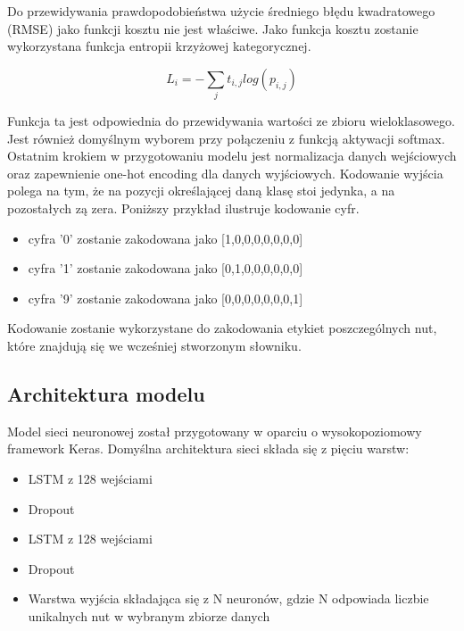 	
	
	Do przewidywania prawdopodobieństwa użycie średniego błędu kwadratowego (RMSE) jako funkcji kosztu nie jest właściwe. Jako funkcja kosztu zostanie wykorzystana funkcja entropii krzyżowej kategorycznej. 
	
	\begin{equation}
	L_{i} = - \sum_{j}t_{i,j} log(p_{i,j})
	\end{equation}
	
	Funkcja ta jest odpowiednia do przewidywania wartości ze zbioru wieloklasowego. Jest również domyślnym wyborem przy połączeniu z funkcją aktywacji softmax. Ostatnim krokiem w przygotowaniu modelu jest normalizacja danych wejściowych oraz zapewnienie one-hot encoding dla danych wyjściowych. Kodowanie wyjścia polega na tym, że na pozycji określającej daną klasę stoi jedynka, a na pozostałych zą zera. Poniższy przykład ilustruje kodowanie cyfr. 
	
	\begin{itemize}
		\item cyfra '0' zostanie zakodowana jako [1,0,0,0,0,0,0,0]
		\item cyfra '1' zostanie zakodowana jako [0,1,0,0,0,0,0,0]
		\item cyfra '9' zostanie zakodowana jako [0,0,0,0,0,0,0,1]
	\end{itemize}
	
	Kodowanie zostanie wykorzystane do zakodowania etykiet poszczególnych nut, które znajdują się we wcześniej stworzonym słowniku. 
	
	\subsection{Architektura modelu}
	
	Model sieci neuronowej został przygotowany w oparciu o wysokopoziomowy framework Keras. Domyślna architektura sieci składa się z pięciu warstw:
	
	\begin{itemize}
		\item LSTM z 128 wejściami
		\item Dropout
		\item LSTM z 128 wejściami
		\item Dropout
		\item Warstwa wyjścia składająca się z N neuronów, gdzie N odpowiada liczbie unikalnych nut w wybranym zbiorze danych
	\end{itemize}

